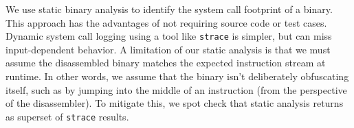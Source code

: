\begin{comment}
Formally, \compatmetric{} is the expected fraction of packages on a given system($\mathtt{Inst}$)
having an API footprint within the target 
system's supported APIs.
By assuming independence of package installation, we can calculate the probability of supporting an installation as follows:
\begin{align*}
&\mathtt{Weighted Compliance}(\mathtt{API}_\mathtt{Supported}) =\\
&E(\frac{|\mathtt{Pkg}_\mathtt{Supported} \bigcap \mathtt{Inst}|}{|\mathtt{Inst}|}) \sim \frac{E(|\mathtt{Pkg}_\mathtt{Supported} \bigcap \mathtt{Inst}|)}{E(|\mathtt{Inst}|)} \\
&\sim \frac{\sum_{\mathtt{pkg} \in \mathtt{Pkg}_\mathtt{Supported}} (\frac{\text{installation of $\mathtt{pkg}$}}{\text{total installation}})}{\sum_{\mathtt{pkg} \in \mathtt{Pkg}_\mathtt{all\hspace{0.21in}}} (\frac{\text{installation of $\mathtt{pkg}$}}{\text{total installation}})} \\
&\text{where E}(\mathtt{x})\text{ is the Expectation of }\mathtt{x}\text{ occurring.}
\end{align*}
\end{comment}


\label{sec:metric:collection}

We use static binary analysis to identify the system call footprint of a binary.  This approach has the advantages
of not requiring source code or test cases.  Dynamic system call logging using a tool like {\tt strace} is simpler,
but can miss input-dependent behavior.  A limitation of our static analysis is that we must assume the disassembled binary
matches the expected instruction stream at runtime.  In other words, we assume that the binary isn't deliberately obfuscating
itself, such as by jumping into the middle of an instruction (from the perspective of the disassembler).
To mitigate this, we spot check that static analysis returns as superset of {\tt strace} results.

